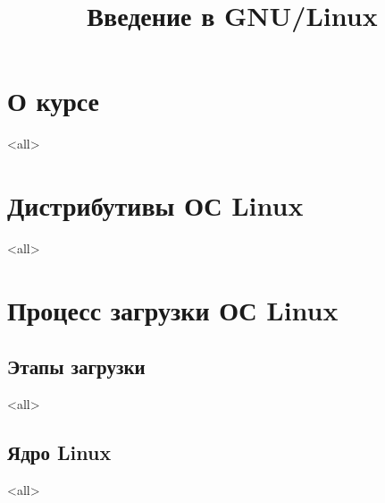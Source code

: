 

\title{Введение в GNU/Linux}





\begin{frame}
	\frametitle{}
	\titlepage
	\vspace{-0.5cm}
	\begin{center}
	\end{center}
\end{frame}


\begin{frame}
	\tableofcontents
	[hideallsubsections]
\end{frame}

\section{О курсе}

\mode<all>{}



\section{Дистрибутивы ОС Linux}
\mode<all>{}

\section{Процесс загрузки ОС Linux}
\subsection{Этапы загрузки}
\mode<all>{}

\subsection{Ядро Linux}
\mode<all>{}


